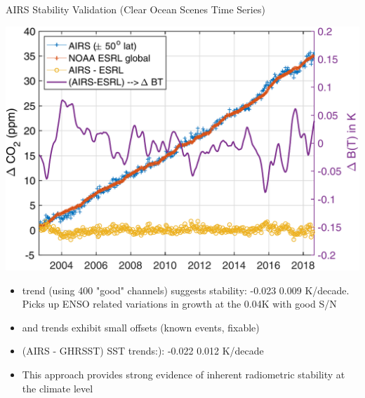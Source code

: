 \documentclass[10pt,t]{beamer}
\begin{document}
\begin{frame}{AIRS Stability Validation (Clear Ocean Scenes Time Series)}
\vspace{-0.1in}
\begin{center}
\includegraphics[width=0.65\linewidth]{SunClimate2022/fig10.pdf}
\end{center}

\vspace{-0.05in}
\footnotesize
\begin{itemize}
\item \cd trend (using 400 "good" channels) suggests stability:  -0.023 \textpm{} 0.009 K/decade.  Picks up ENSO related variations in \cd growth at the 0.04K with good S/N
\item \methane and \nitrous trends exhibit small offsets (known events, fixable)
\item (AIRS - GHRSST) SST trends:):  -0.022 \textpm{} 0.012 K/decade
\item This approach provides strong evidence of inherent radiometric stability at the climate level
\end{itemize}
\end{frame}
\end{document}
